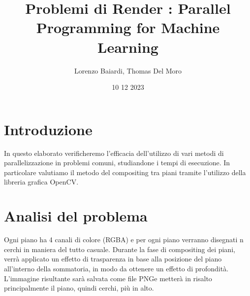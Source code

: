 \documentclass[11pt]{article}
\title{Problemi di Render : Parallel Programming for Machine Learning}
\author{Lorenzo Baiardi, Thomas Del Moro}
\date{10 12 2023}
\begin{document}
    \maketitle
    \clearpage

    \section{Introduzione}\label{sec:introduzione}
    In questo elaborato verificheremo l'efficacia dell'utilizzo di vari metodi di parallelizzazione in problemi comuni,
    studiandone i tempi di esecuzione.
    In particolare valutiamo il metodo del compositing tra piani tramite l'utilizzo della libreria grafica OpenCV\@.

    \section{Analisi del problema}\label{sec:analisi-del-problema}
    Ogni piano ha 4 canali di colore (RGBA) e per ogni piano verranno disegnati n cerchi in maniera del tutto casuale.
    Durante la fase di compositing dei piani, verrà applicato un effetto di trasparenza in base alla posizione del piano
    all'interno della sommatoria, in modo da ottenere un effetto di profondità.
    L'immagine risultante sarà salvata come file PNG\@ e metterà in risalto principalmente il piano, quindi cerchi,
    più in alto.
\end{document}
